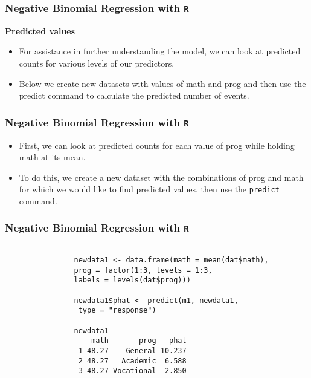 \documentclass[00-GLMregslides.tex]{subfiles}
\begin{document}
	\begin{frame}[fragile]
		\frametitle{Negative Binomial Regression with \texttt{R} }
		\Large
		
		\textbf{Predicted values}
		\begin{itemize}
			\item	For assistance in further understanding the model, we can look at predicted counts for various levels of our predictors. 
			\item Below we create new datasets with values of math and prog and then use the predict command to calculate the predicted number of events.
		\end{itemize}
	\end{frame}
	\begin{frame}[fragile]
		\frametitle{Negative Binomial Regression with \texttt{R} }
		\Large
		
		\begin{itemize}
			\item	First, we can look at predicted counts for each value of prog while holding math at its mean. 
			\item To do this, we create a new dataset with the combinations of prog and math for which we would like to find predicted values, then use the \texttt{predict} command.
		\end{itemize}
	\end{frame}
	\begin{frame}[fragile]
		\frametitle{Negative Binomial Regression with \texttt{R} }
		\large
		
		\begin{framed}
			\begin{verbatim}
			
				newdata1 <- data.frame(math = mean(dat$math), 
				prog = factor(1:3, levels = 1:3, 
				labels = levels(dat$prog)))
				
				newdata1$phat <- predict(m1, newdata1, 
				 type = "response")
				 
				newdata1
				    math       prog   phat
				 1 48.27    General 10.237
				 2 48.27   Academic  6.588
				 3 48.27 Vocational  2.850
			
			\end{verbatim}	
		\end{framed}
		
		
	\end{frame}
\end{document}
